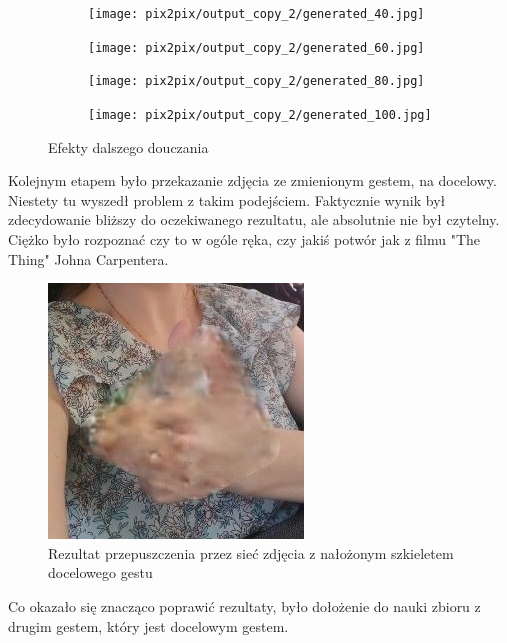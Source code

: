 \documentclass[12pt]{article}
\begin{document}
\begin{sloppypar}
{{\begin{figure}
\begin{subfigure}{.5\textwidth}
        \centering
        \texttt{[image: pix2pix/output\_copy\_2/generated\_40.jpg]}
      \end{subfigure}
      \begin{subfigure}{.5\textwidth}
        \centering
        \texttt{[image: pix2pix/output\_copy\_2/generated\_60.jpg]}
      \end{subfigure}
      \begin{subfigure}{.5\textwidth}
        \centering
        \texttt{[image: pix2pix/output\_copy\_2/generated\_80.jpg]}
      \end{subfigure}
      \begin{subfigure}{.5\textwidth}
        \centering
        \texttt{[image: pix2pix/output\_copy\_2/generated\_100.jpg]}
      \end{subfigure}
      \caption{Efekty dalszego douczania}
    \end{figure}
    Kolejnym etapem było przekazanie zdjęcia ze zmienionym gestem, na docelowy.
    Niestety tu wyszedł problem z takim podejściem. 
    Faktycznie wynik był zdecydowanie bliższy do oczekiwanego rezultatu, ale absolutnie nie był czytelny.
    Ciężko było rozpoznać czy to w ogóle ręka, czy jakiś potwór jak z filmu "The Thing" Johna Carpentera.
    \begin{figure}
      \centering
      \includegraphics[width=.8\linewidth]{pix2pix/generated_single.jpg}
      \caption{Rezultat przepuszczenia przez sieć zdjęcia z nałożonym szkieletem docelowego gestu}
    \end{figure}
    Co okazało się znacząco poprawić rezultaty, było dołożenie do nauki zbioru z drugim gestem, który jest docelowym gestem. 
}}
\end{sloppypar}
\end{document}
